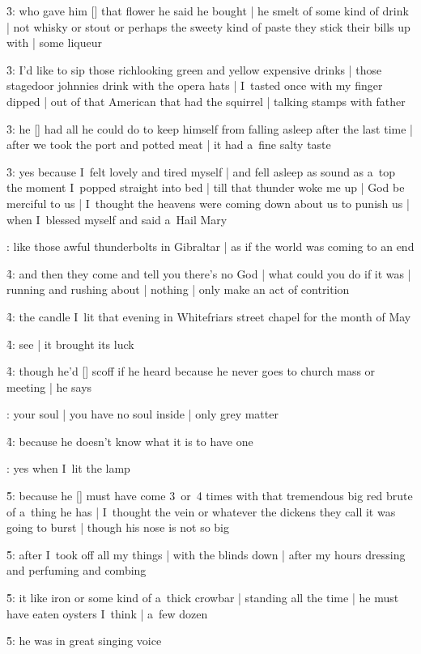 \f3:
who gave him [\bloom] that flower he said he bought |
he smelt of some kind of drink |
not whisky or stout or perhaps the sweety kind of paste they stick their bills up with |
some liqueur

\f3:
I'd like to sip those richlooking green and yellow expensive drinks |
those stagedoor johnnies drink with the opera hats |
I~tasted once with my finger dipped |
out of that American that had the squirrel |
talking stamps with father

\f3:
he [\boylan] had all he could do
to keep himself from falling asleep after the last time |
after we took the port and potted meat |
it had a~fine salty taste

\f3:
yes because I~felt lovely and tired myself |
and fell asleep as sound as a~top the moment I~popped straight into bed |
till that thunder woke me up |
God be merciful to us |
I~thought the heavens were coming down about us to punish us |
when I~blessed myself and said a~Hail Mary

:
like those awful thunderbolts in Gibraltar |
as if the world was coming to an end

\f4:
and then they come and tell you there's no God |
what could you do if it was |
running and rushing about |
nothing |
only make an act of contrition

\f4:
the candle I~lit that evening in Whitefriars street chapel for the month of May

\f4:
see |
it brought its luck

\f4:
though he'd [\bloom] scoff if he heard because he never goes to church mass or meeting |
he says

:
your soul |
you have no soul inside |
only grey matter

\f4:
because he doesn't know what it is to have one

:
yes when I~lit the lamp

\f5:
because he [\boylan] must have come 3~or~4 times
with that tremendous big red brute of a~thing he has |
I~thought the vein or whatever the dickens they call it was going to burst |
though his nose is not so big

\f5:
after I~took off all my things |
with the blinds down |
after my hours dressing and perfuming and combing

\f5:
it like iron or some kind of a~thick crowbar |
standing all the time |
he must have eaten oysters I~think |
a~few dozen

\f5:
he was in great singing voice

